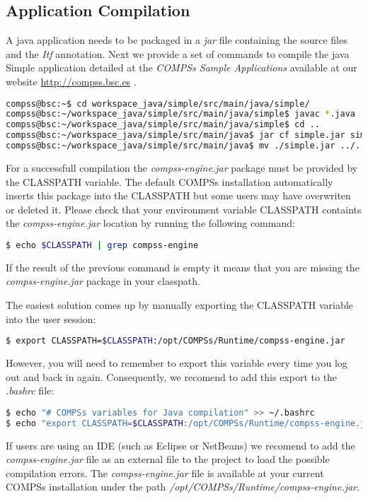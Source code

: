 \subsection{Application Compilation}
A java application needs to be packaged in a \textit{jar} file containing the source files and the \textit{Itf} annotation.
Next we provide a set of commands to compile the java Simple application detailed at the \textit{COMPSs Sample Applications} 
available at our website \url{http://compss.bsc.es} .
\begin{lstlisting}[language=bash]
compss@bsc:~$ cd workspace_java/simple/src/main/java/simple/
compss@bsc:~/workspace_java/simple/src/main/java/simple$ javac *.java
compss@bsc:~/workspace_java/simple/src/main/java/simple$ cd ..
compss@bsc:~/workspace_java/simple/src/main/java$ jar cf simple.jar simple/
compss@bsc:~/workspace_java/simple/src/main/java$ mv ./simple.jar ../../../jar/
\end{lstlisting}

For a successfull compilation the \textit{compss-engine.jar} package must be provided by the CLASSPATH variable. The default COMPSs
installation automatically inserts this package into the CLASSPATH but some users may have overwriten or deleted it. Please check
that your environment variable CLASSPATH containts the \textit{compss-engine.jar} location by running the following command:
\begin{lstlisting}[language=bash]
$ echo $CLASSPATH | grep compss-engine
\end{lstlisting}
If the result of the previous command is empty it means that you are missing the \textit{compss-engine.jar} package in your classpath. 

The easiest solution comes up by manually exporting the CLASSPATH variable into the user session:
\begin{lstlisting}[language=bash]
$ export CLASSPATH=$CLASSPATH:/opt/COMPSs/Runtime/compss-engine.jar
\end{lstlisting}
However, you will need to remember to export this variable every time you log out and back in again. Consequently, we recomend to 
add this export to the \textit{.bashrc} file:
\begin{lstlisting}[language=bash]
$ echo "# COMPSs variables for Java compilation" >> ~/.bashrc
$ echo "export CLASSPATH=$CLASSPATH:/opt/COMPSs/Runtime/compss-engine.jar" >> ~/.bashrc
\end{lstlisting}

If users are using an IDE (such as Eclipse or NetBeans) we recomend to add the \textit{compss-engine.jar} file as an external file 
to the project to load the possible compilation errors. The \textit{compss-engine.jar} file is available at your current 
COMPSs installation under the path \textit{/opt/COMPSs/Runtime/compss-engine.jar}.

